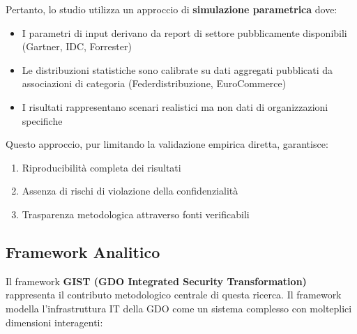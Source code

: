 \documentclass[12pt,a4paper,oneside]{book}
\providecommand{\tightlist}{%
  \setlength{\itemsep}{0pt}\setlength{\parskip}{0pt}
}
\numberwithin{figure}{chapter} %
\numberwithin{table}{chapter}  %
\begin{document}
Pertanto, lo studio utilizza un approccio di \textbf{simulazione parametrica} dove:

\begin{itemize}
\tightlist
\item
  I parametri di input derivano da report di settore pubblicamente
  disponibili (Gartner, IDC, Forrester)\\
\item
  Le distribuzioni statistiche sono calibrate su dati aggregati
  pubblicati da associazioni di categoria (Federdistribuzione,
  EuroCommerce)\\
\item
  I risultati rappresentano scenari realistici ma non dati di
  organizzazioni specifiche
\end{itemize}

Questo approccio, pur limitando la validazione empirica diretta,
garantisce:

\begin{enumerate}
\def\labelenumi{\arabic{enumi}.}
\tightlist
\item
  Riproducibilità completa dei risultati\\
\item
  Assenza di rischi di violazione della confidenzialità\\
\item
  Trasparenza metodologica attraverso fonti verificabili
\end{enumerate}

\subsection{\texorpdfstring{\textbf{Framework
Analitico}}{1.5.2 Framework Analitico}}\label{framework-analitico}

Il framework \textbf{GIST (GDO Integrated Security Transformation)} rappresenta il contributo metodologico centrale di questa ricerca. 
Il framework modella l'infrastruttura IT della GDO come un sistema complesso con molteplici dimensioni interagenti:
\end{document}
